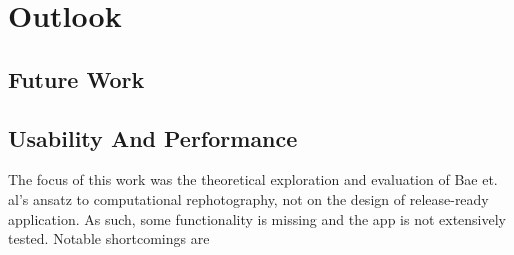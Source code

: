 \chapter{Outlook}\label{ch:outlook}
\section{Future Work}


\section{Usability And Performance}

The focus of this work was the theoretical exploration and evaluation of Bae et.
al's ansatz to computational rephotography, not on the design of release-ready
application. As such, some functionality is missing and the app is not
extensively tested. Notable shortcomings are
